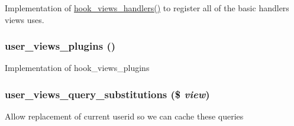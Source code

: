 Implementation of \hyperlink{group__views__hooks_gbf506f44bd8d8a86876f27396f5341ed}{hook\_\-views\_\-handlers()} to register all of the basic handlers views uses. \hypertarget{group__views__user__module_ga36ee99043e81c01d59f8f7c47d310d1}{
\subsubsection[{user\_\-views\_\-plugins}]{\setlength{\rightskip}{0pt plus 5cm}user\_\-views\_\-plugins ()}}
\label{group__views__user__module_ga36ee99043e81c01d59f8f7c47d310d1}


Implementation of hook\_\-views\_\-plugins \hypertarget{group__views__user__module_ge3007fb2a7423125b3458d4018293eba}{
\subsubsection[{user\_\-views\_\-query\_\-substitutions}]{\setlength{\rightskip}{0pt plus 5cm}user\_\-views\_\-query\_\-substitutions (\$ {\em view})}}
\label{group__views__user__module_ge3007fb2a7423125b3458d4018293eba}


Allow replacement of current userid so we can cache these queries 